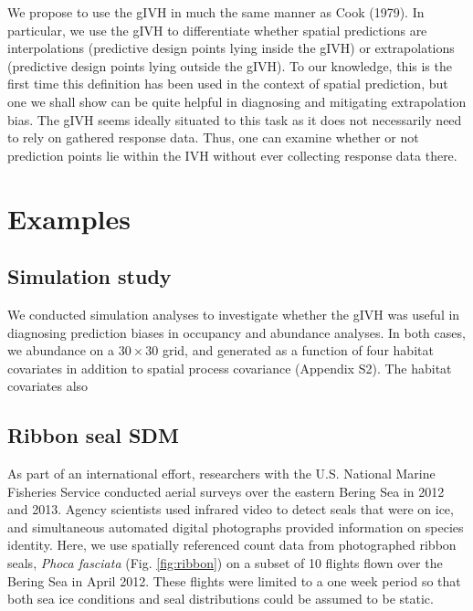 \documentclass[12pt,english]{article}
\begin{document}
\begin{spacing}{1.9}
We propose to use the gIVH in much the same manner as Cook (1979).  In particular, we use the gIVH to differentiate whether spatial predictions are interpolations (predictive design points lying inside the gIVH) or extrapolations (predictive design points lying outside the gIVH).  To our knowledge, this is the first time this definition has been used in the context of spatial prediction, but one we shall show can be quite helpful in diagnosing and mitigating extrapolation bias.  The gIVH seems ideally situated to this task as it does not necessarily need to rely on gathered response data. Thus, one can examine whether or not prediction points lie within the IVH without ever collecting response data there.

\section{Examples}

\subsection{Simulation study}

We conducted simulation analyses to investigate whether the gIVH was useful in diagnosing prediction biases in occupancy and abundance analyses. In both cases, we abundance on a $30 \times 30$ grid, and generated as a function of four habitat covariates in addition to spatial process covariance (Appendix S2). The habitat covariates also

\subsection{Ribbon seal SDM}
As part of an international effort, researchers with the U.S. National Marine Fisheries Service conducted aerial surveys over the eastern Bering Sea in 2012 and 2013.  Agency scientists used infrared video to detect seals that were on ice, and simultaneous automated digital photographs provided information on species identity. Here, we use spatially referenced count data from photographed ribbon seals, {\it Phoca fasciata} (Fig. \ref{fig:ribbon}) on a subset of 10 flights flown over the Bering Sea in April 2012.  These flights were limited to a one week period so that both sea ice conditions and seal distributions could be assumed to be static.


\end{spacing}
\end{document}
